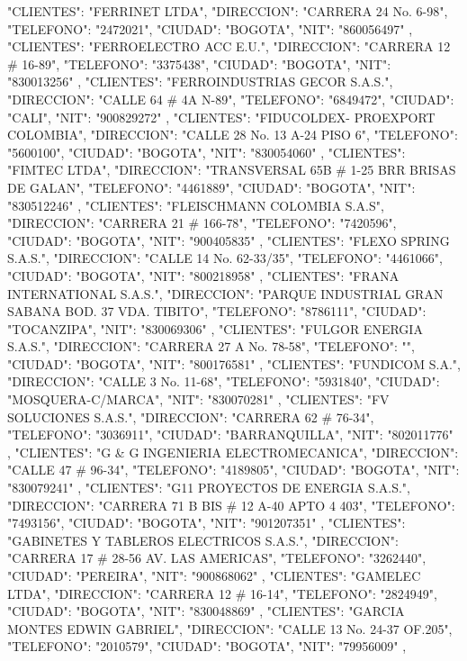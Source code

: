   {
   "CLIENTES": "FERRINET LTDA",
   "DIRECCION": "CARRERA 24 No. 6-98",
   "TELEFONO": "2472021",
   "CIUDAD": "BOGOTA",
   "NIT": "860056497"
   },
   {
   "CLIENTES": "FERROELECTRO ACC E.U.",
   "DIRECCION": "CARRERA 12 # 16-89",
   "TELEFONO": "3375438",
   "CIUDAD": "BOGOTA",
   "NIT": "830013256"
   },
   {
   "CLIENTES": "FERROINDUSTRIAS GECOR S.A.S.",
   "DIRECCION": "CALLE 64 # 4A N-89",
   "TELEFONO": "6849472",
   "CIUDAD": "CALI",
   "NIT": "900829272"
   },
   {
   "CLIENTES": "FIDUCOLDEX- PROEXPORT COLOMBIA",
   "DIRECCION": "CALLE 28 No. 13 A-24 PISO 6",
   "TELEFONO": "5600100",
   "CIUDAD": "BOGOTA",
   "NIT": "830054060"
   },
   {
   "CLIENTES": "FIMTEC LTDA",
   "DIRECCION": "TRANSVERSAL 65B # 1-25 BRR BRISAS DE GALAN",
   "TELEFONO": "4461889",
   "CIUDAD": "BOGOTA",
   "NIT": "830512246"
   },
   {
   "CLIENTES": "FLEISCHMANN COLOMBIA S.A.S",
   "DIRECCION": "CARRERA 21 # 166-78",
   "TELEFONO": "7420596",
   "CIUDAD": "BOGOTA",
   "NIT": "900405835"
   },
   {
   "CLIENTES": "FLEXO SPRING S.A.S.",
   "DIRECCION": "CALLE 14 No. 62-33/35",
   "TELEFONO": "4461066",
   "CIUDAD": "BOGOTA",
   "NIT": "800218958"
   },
   {
   "CLIENTES": "FRANA INTERNATIONAL S.A.S.",
   "DIRECCION": "PARQUE INDUSTRIAL GRAN SABANA BOD. 37 VDA. TIBITO",
   "TELEFONO": "8786111",
   "CIUDAD": "TOCANZIPA",
   "NIT": "830069306"
   },
   {
   "CLIENTES": "FULGOR ENERGIA S.A.S.",
   "DIRECCION": "CARRERA 27 A No. 78-58",
   "TELEFONO": "",
   "CIUDAD": "BOGOTA",
   "NIT": "800176581"
   },
   {
   "CLIENTES": "FUNDICOM S.A.",
   "DIRECCION": "CALLE 3 No. 11-68",
   "TELEFONO": "5931840",
   "CIUDAD": "MOSQUERA-C/MARCA",
   "NIT": "830070281"
   },
   {
   "CLIENTES": "FV SOLUCIONES S.A.S.",
   "DIRECCION": "CARRERA 62 # 76-34",
   "TELEFONO": "3036911",
   "CIUDAD": "BARRANQUILLA",
   "NIT": "802011776"
   },
   {
   "CLIENTES": "G & G INGENIERIA ELECTROMECANICA",
   "DIRECCION": "CALLE 47 # 96-34",
   "TELEFONO": "4189805",
   "CIUDAD": "BOGOTA",
   "NIT": "830079241"
   },
   {
   "CLIENTES": "G11 PROYECTOS DE ENERGIA S.A.S.",
   "DIRECCION": "CARRERA 71 B BIS # 12 A-40 APTO 4 403",
   "TELEFONO": "7493156",
   "CIUDAD": "BOGOTA",
   "NIT": "901207351"
   },
   {
   "CLIENTES": "GABINETES Y TABLEROS ELECTRICOS S.A.S.",
   "DIRECCION": "CARRERA 17 # 28-56 AV. LAS AMERICAS",
   "TELEFONO": "3262440",
   "CIUDAD": "PEREIRA",
   "NIT": "900868062"
   },
   {
   "CLIENTES": "GAMELEC LTDA",
   "DIRECCION": "CARRERA 12 # 16-14",
   "TELEFONO": "2824949",
   "CIUDAD": "BOGOTA",
   "NIT": "830048869"
   },
   {
   "CLIENTES": "GARCIA MONTES EDWIN GABRIEL",
   "DIRECCION": "CALLE 13 No. 24-37 OF.205",
   "TELEFONO": "2010579",
   "CIUDAD": "BOGOTA",
   "NIT": "79956009"
   },
